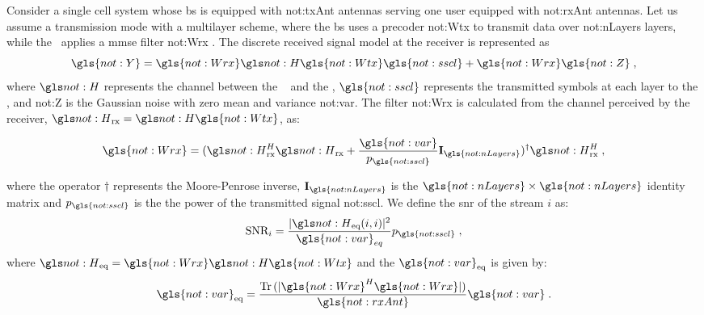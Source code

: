 Consider a single cell system whose \gls{bs} is equipped with \gls{not:txAnt} antennas serving one user equipped with \gls{not:rxAnt} antennas.
%
Let us assume a transmission mode with a multilayer scheme, where the \gls{bs} uses a precoder \gls{not:Wtx}  to transmit data over  \gls{not:nLayers} layers, while the \ue~applies a \gls{mmse} filter \gls{not:Wrx} .
%
The discrete received signal model at the receiver is represented as
\begin{equation}
\label{eq.:rx_signal}
\gls{not:Y} =
\gls{not:Wrx}
\channel
\gls{not:Wtx}
\gls{not:sscl}
+
\gls{not:Wrx}
\gls{not:Z} \;,
\end{equation}
\noindent where $\channel $  represents the channel between the \base~ and the \ue, $\gls{not:sscl}$ represents the transmitted symbols at each layer to the \ue, and \gls{not:Z} is the Gaussian noise with zero mean and variance \gls{not:var}.
%
The filter \gls{not:Wrx} is calculated from the channel perceived by the receiver, $\channel_{\textrm{rx}} = \channel \gls{not:Wtx}$, as:

\begin{equation}
\label{eq.:Wrx}
\gls{not:Wrx} =
(
\channel_{\textrm{rx}}^H
\channel_{\textrm{rx}}
+
\frac{ \gls{not:var} }{ p_{\gls{not:sscl}} }
\mathbf{I}_{\gls{not:nLayers}} )^\dagger
\channel_{\textrm{rx}}^H \;,
\end{equation}

\noindent where the operator $\dagger$ represents the Moore-Penrose inverse, $\mathbf{ I}_{\gls{not:nLayers}} $ is the $\gls{not:nLayers} \times \gls{not:nLayers}$ identity matrix and $p_{\gls{not:sscl}}$ is the the power of the transmitted signal \gls{not:sscl}.
%
We define the \gls{snr} of the stream $i$ as:
%
\begin{equation}
\label{eq.:snr}
\textrm{SNR}_i = \frac{ \abs{
		\channel_{\textrm{eq}} (i,i)
	}^2 }{\gls{not:var}_{eq}} p_{\gls{not:sscl}} \; ,
\end{equation}
%
where $\channel_{\textrm{eq}} = \gls{not:Wrx} \channel \gls{not:Wtx}$ and the $\gls{not:var}_{\textrm{eq}}$ is given by:
%
\begin{equation}
\gls{not:var}_{\textrm{eq}} = \frac{
	\Tr \,  (\abs{ \gls{not:Wrx}^H \gls{not:Wrx} } )}
{\gls{not:rxAnt}}
\gls{not:var} \;.
\end{equation}


